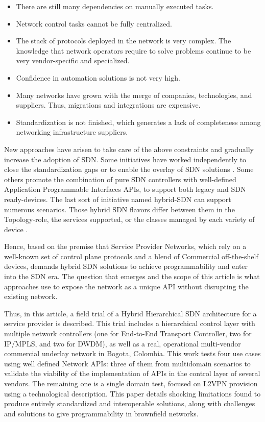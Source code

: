 \documentclass[a4paper,fleqn]{cas-dc}
\begin{document}
\begin{itemize}
    \item There are still many dependencies on manually executed tasks.
    \item Network control tasks cannot be fully centralized.
    \item The stack of protocols deployed in the network is very complex.  The knowledge that network operators require to solve problems continue to be very vendor-specific and specialized.
    \item Confidence in automation solutions is not very high.
    \item Many networks have grown with the merge of companies, technologies, and suppliers. Thus, migrations and integrations are expensive. 
   \item Standardization is not finished, which generates a lack of completeness among networking infrastructure suppliers.
\end{itemize}

New approaches have arisen to take care of the above constraints and gradually increase the adoption of SDN. Some initiatives have worked independently to close the standardization gaps or to enable the overlay of SDN solutions \cite{bemby2015vino}. Some others promote the combination of pure SDN controllers with well-defined Application Programmable Interfaces APIs, to support both legacy and SDN ready-devices. The last sort of initiative named hybrid-SDN can support numerous scenarios. Those hybrid SDN flavors differ between them in the Topology-role, the services supported, or the classes managed by each variety of device \cite{vissicchio2014opportunities}. 

Hence, based on the premise that Service Provider Networks, which rely on a well-known set of control plane protocols and a blend of Commercial off-the-shelf devices, demands hybrid SDN solutions to achieve programmability and enter into the SDN era. The question that emerges and the scope of this article is what approaches use to expose the network as a unique API without disrupting the existing network. 

Thus, in this article, a field trial of a Hybrid Hierarchical SDN architecture for a service provider is described. This trial includes a hierarchical control layer with multiple network controllers (one for End-to-End Transport Controller, two for IP/MPLS, and two for DWDM), as well as a real, operational multi-vendor commercial underlay network in Bogota, Colombia. This work tests four use cases using well defined Network APIs: three of them from multidomain scenarios to validate the viability of the implementation of APIs in the control layer of several vendors. The remaining one is a single domain test, focused on L2VPN provision using a technological description. This paper details shocking limitations found to produce entirely standardized and interoperable solutions, along with challenges and solutions to give programmability in brownfield networks.
\end{document}
